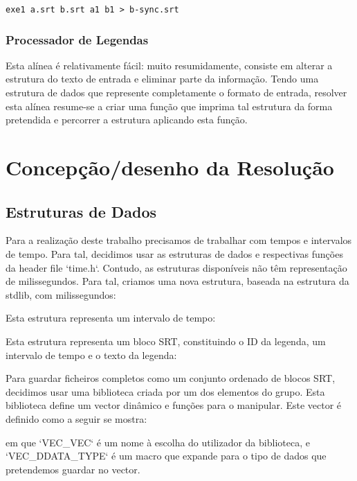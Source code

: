 \documentclass{report}
\begin{document}
\begin{verbatim}
exe1 a.srt b.srt a1 b1 > b-sync.srt
\end{verbatim}

\subsection{Processador de Legendas}

Esta alínea é relativamente fácil: muito resumidamente, consiste em alterar a estrutura do texto de entrada e eliminar parte da informação. Tendo uma estrutura de dados que represente completamente o formato de entrada, resolver esta alínea resume-se a criar uma função que imprima tal estrutura da forma pretendida e percorrer a estrutura aplicando esta função.

\chapter{Concepção/desenho da Resolução}

\section{Estruturas de Dados}

Para a realização deste trabalho precisamos de trabalhar com tempos e intervalos de tempo. Para tal, decidimos usar as estruturas de dados e respectivas funções da header file `time.h`. Contudo, as estruturas disponíveis não têm representação de milissegundos. Para tal, criamos uma nova estrutura, baseada na estrutura da stdlib, com milissegundos:


Esta estrutura representa um intervalo de tempo:


Esta estrutura representa um bloco SRT, constituindo o ID da legenda, um intervalo de tempo e o texto da legenda:


Para guardar ficheiros completos como um conjunto ordenado de blocos SRT, decidimos usar uma biblioteca criada por um dos elementos do grupo. Esta biblioteca define um vector dinâmico e funções para o manipular.
Este vector é definido como a seguir se mostra:

em que `VEC\_VEC` é um nome à escolha do utilizador da biblioteca, e `VEC\_DDATA\_TYPE` é um macro que expande para o tipo de dados que pretendemos guardar no vector.
\end{document}

